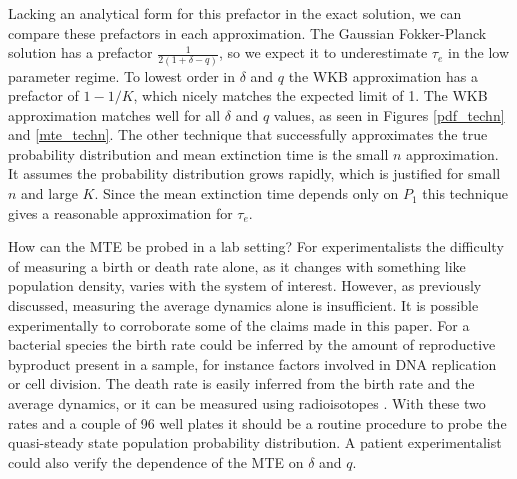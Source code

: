 \documentclass[a4paper,10pt]{article}
\numberwithin{equation}{section} %
\begin{document}
Lacking an analytical form for this prefactor in the exact solution, we can compare these prefactors in each approximation. 
The Gaussian Fokker-Planck solution has a prefactor $\frac{1}{2(1+\delta-q)}$, so we expect it to underestimate $\tau_e$ in the low parameter regime. %
To lowest order in $\delta$ and $q$ the WKB approximation has a prefactor of $1-1/K$, which nicely matches the expected limit of 1. 
The WKB approximation matches well for all $\delta$ and $q$ values, as seen in Figures \ref{pdf_techn} and \ref{mte_techn}. 
The other technique that successfully approximates the true probability distribution and mean extinction time is the small $n$ approximation. %
It assumes the probability distribution grows rapidly, which is justified for small $n$ and large $K$. 
Since the mean extinction time depends only on $P_1$ this technique gives a reasonable approximation for $\tau_e$. 


How can the MTE be probed in a lab setting? 
For experimentalists the difficulty of measuring a birth or death rate alone, as it changes with something like population density, varies with the system of interest. 
However, as previously discussed, measuring the average dynamics alone is insufficient. 
It is possible experimentally to corroborate some of the claims made in this paper. 
For a bacterial species the birth rate could be inferred by the amount of reproductive byproduct present in a sample, for instance factors involved in DNA replication or cell division. %
The death rate is easily inferred from the birth rate and the average dynamics, or it can be measured using radioisotopes \cite{Servais1985}. %
With these two rates and a couple of 96 well plates it should be a routine procedure to probe the quasi-steady state population probability distribution. 
A patient experimentalist could also verify the dependence of the MTE on $\delta$ and $q$.  %
\end{document}
